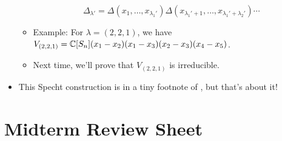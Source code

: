 \documentclass[../notes.tex]{subfiles}
\begin{document}
\begin{itemize}
\begin{itemize}
\begin{equation*}
            \Delta_{\lambda'} = \Delta(x_1,\dots,x_{\lambda_1'})\Delta(x_{\lambda_1'+1},\dots,x_{\lambda_1'+\lambda_2'})\cdots
        \end{equation*}
        \item Example: For $\lambda=(2,2,1)$, we have $V_{(2,2,1)}=\mathbb{C}[S_n](x_1-x_2)(x_1-x_3)(x_2-x_3)(x_4-x_5)$.
        \item Next time, we'll prove that $V_{(2,2,1)}$ is irreducible.
    \end{itemize}
    \item This Specht construction is in a tiny footnote of \textcite{bib:FultonHarris}, but that's about it!
\end{itemize}



\section{Midterm Review Sheet}
\end{document}
